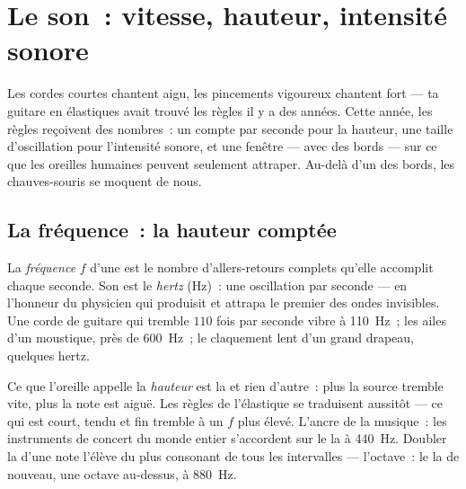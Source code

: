 \chapter{Le son~: vitesse, hauteur, intensité sonore}\label{ch:g8:sound-pitch-loudness}

Les cordes courtes chantent aigu, les pincements vigoureux chantent
fort --- ta guitare en élastiques avait trouvé les règles il y a des
années. Cette année, les règles reçoivent des nombres~: un compte par
seconde pour la hauteur, une taille d'oscillation pour l'intensité
sonore, et une fenêtre --- avec des bords --- sur ce que les oreilles
humaines peuvent seulement attraper. Au-delà d'un des bords, les
chauves-souris se moquent de nous.

\section{La fréquence~: la hauteur comptée}

\begin{definition}[Fréquence]\label{def:g8:sound-pitch-loudness:frequency}
La \emph{fréquence} $f$ d'une  est le nombre
d'allers-retours complets qu'elle accomplit chaque seconde. Son 
est le \emph{hertz} (\unit{Hz})~: une oscillation par
seconde --- en l'honneur du physicien qui produisit et attrapa le
premier des ondes invisibles. Une corde de guitare qui tremble $110$
fois par seconde vibre à \qty{110}{Hz}~; les ailes d'un moustique,
près de \qty{600}{Hz}~; le claquement lent d'un grand drapeau,
quelques hertz.
\end{definition}

\begin{proposition}\label{prop:g8:sound-pitch-loudness:pitch}
Ce que l'oreille appelle la \emph{hauteur} est la  et rien
d'autre~: plus la source tremble vite, plus la note est aiguë. Les
règles de l'élastique se traduisent aussitôt --- ce qui est court,
tendu et fin tremble à un $f$ plus élevé. L'ancre de la musique~: les
instruments de concert du monde entier s'accordent sur le la à
\qty{440}{Hz}. Doubler la  d'une note l'élève du plus
consonant de tous les intervalles --- l'octave~: le la de nouveau, une
octave au-dessus, à \qty{880}{Hz}.
\end{proposition}

